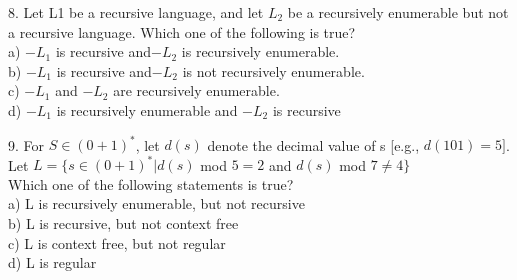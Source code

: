 \documentclass[8pt]{beamer}
\begin{document}
\begin{frame}

\hspace*{-0.4cm}
8. Let L1 be a recursive language, and let $L _{2}$ be a recursively enumerable but not a recursive language.
Which one of the following is true?\\

\vspace*{0.1cm}
\hspace*{0.5cm} a) $-L _{1}$ is recursive and$-L _{2}$ is recursively enumerable.\\
\hspace*{0.5cm} b) $-L _{1}$ is recursive and$-L _{2}$ is not recursively enumerable.\\
\hspace*{0.5cm} c) $-L _{1}$ and $-L _{2}$ are recursively enumerable.\\
\hspace*{0.5cm} d) $-L _{1}$ is recursively enumerable and $-L _{2}$ is recursive\\
\vspace*{0.2cm}

\hspace*{-0.4cm}
9. For $S \in (0 + 1)^{*}$, let $d(s)$ denote the decimal value of s [e.g., $d(101) = 5]$. Let $L = \{s \in (0 + 1)^{*} |
d(s)$ mod $5 = 2$ and $d(s)$ mod $7 \neq 4\}$\\

\vspace*{0.1cm}
\hspace*{0.5cm} Which one of the following statements is true?\\
\hspace*{0.5cm} a) L is recursively enumerable, but not recursive\\
\hspace*{0.5cm} b) L is recursive, but not context free\\
\hspace*{0.5cm} c) L is context free, but not regular\\
\hspace*{0.5cm} d) L is regular\\
\end{frame}
\end{document}
